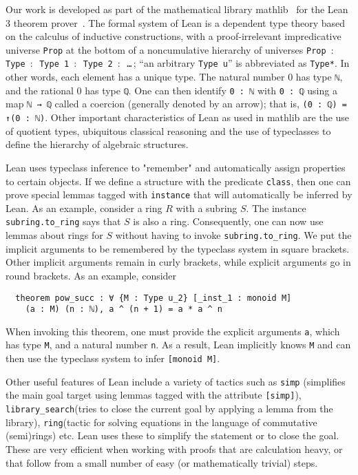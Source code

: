 \documentclass[sn-mathphys]{sn-jnl}%
\newcommand{\lean}[1]{\texttt{#1}\xspace}
\newcommand{\mathlib}{\textsf{mathlib}\xspace}
\begin{document}
Our work is developed as part of the mathematical library \mathlib~\cite{mathlib} for the Lean 3 theorem prover~\cite{lean-prover}.
The formal system of Lean is a dependent type theory based on the calculus of inductive constructions,
with a proof-irrelevant impredicative universe \lean{Prop} at the bottom of a noncumulative hierarchy of universes \lean{Prop $:$ Type $:$ Type 1 $:$ \mbox{Type 2} $:$ \dots}\,; ``an arbitrary \lean{Type u}'' is abbreviated as \lean{Type*}. 
In other words, each element has a unique type. The natural number 0 has type \lean{ℕ}, and the rational 0 has type \lean{ℚ}. One can then identify \lean{0 : ℕ} with \lean{0 : ℚ} using a map \lean{ℕ → ℚ} called a coercion (generally denoted by an arrow); 
that is, \lean{(0 : ℚ) = ↑(0 : ℕ)}. Other important characteristics of Lean as used in \mathlib are the use of quotient types, ubiquitous classical reasoning and the use of typeclasses to define the hierarchy of algebraic structures.

Lean uses typeclass inference to "remember" and automatically assign properties to certain objects. If we define a structure with the predicate \lean{class}, then one can prove special lemmas tagged with \lean{instance} that will automatically 
be inferred by Lean. As an example, consider a ring $R$ with a subring $S$. The instance \lean{subring.to\_ring} says that $S$ is also a ring. Consequently, one can now use lemmas about rings for $S$ without having to invoke \lean{subring.to\_ring}. We 
put the implicit arguments to be remembered by the typeclass system in square brackets. Other implicit arguments remain in curly brackets, while explicit arguments go in round brackets. As an example, consider 
\begin{lstlisting}
  theorem pow_succ : ∀ {M : Type u_2} [_inst_1 : monoid M] 
    (a : M) (n : ℕ), a ^ (n + 1) = a * a ^ n
\end{lstlisting}
When invoking this theorem, one must provide the explicit arguments \lean{a}, which has type \lean{M}, and a natural number \lean{n}. As a result, Lean implicitly knows \lean{M} and can then use the typeclass system to infer \lean{[monoid M]}. 

Other useful features of Lean include a variety of tactics such as \lean{simp} (simplifies the main goal target using lemmas tagged with the attribute \lean{[simp]}), \lean{library\_search}(tries to close the current goal by applying a lemma from the library), 
\lean{ring}(tactic for solving equations in the language of commutative (semi)rings) etc. Lean uses these to simplify the statement or to close the goal. These are very efficient when working with proofs that are calculation heavy, 
or that follow from a small number of easy (or mathematically trivial) steps.
\end{document}
